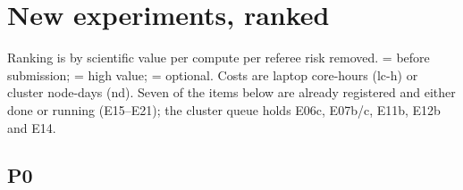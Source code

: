 \section{New experiments, ranked}
\label{sec:plan}

Ranking is by scientific value per compute per referee risk removed.  = before submission;  = high value;  = optional. Costs are laptop core-hours (lc-h) or cluster node-days (nd). Seven of the items below are already registered and either done or running (E15--E21); the cluster queue holds E06c, E07b/c, E11b, E12b and E14.

\subsection*{P0}


